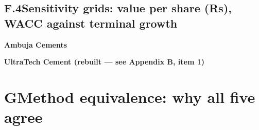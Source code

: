 \vspace{4mm}
\subsection*{F.4\quad Sensitivity grids: value per share (Rs), WACC against terminal growth}
\vspace{1mm}
\begin{minipage}[t]{0.44\textwidth}
{\footnotesize\bfseries\color{navy}Ambuja Cements}\par\vspace{2pt}
{\footnotesize\ambgrid\par}
\end{minipage}\hfill
\begin{minipage}[t]{0.52\textwidth}
{\footnotesize\bfseries\color{navy}UltraTech Cement (rebuilt --- see Appendix B, item 1)}\par\vspace{2pt}
{\footnotesize\utclgrid\par}
\end{minipage}
\clearpage

\section*{G\quad Method equivalence: why all five agree}

